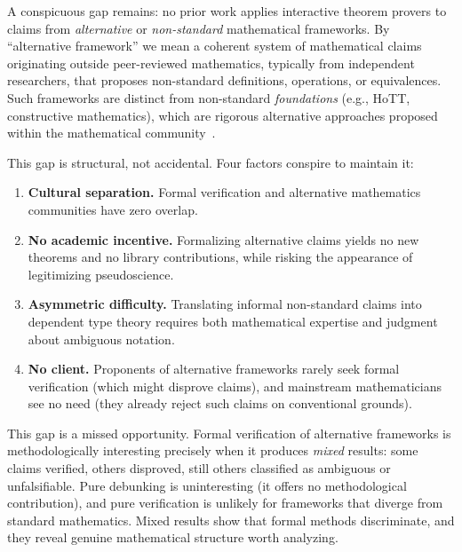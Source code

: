 \documentclass[runningheads]{llncs}
\begin{document}
A conspicuous gap remains: no prior work applies interactive theorem provers to
claims from \emph{alternative} or \emph{non-standard} mathematical frameworks.
By ``alternative framework'' we mean a coherent system of mathematical claims
originating outside peer-reviewed mathematics, typically from independent
researchers, that proposes non-standard definitions, operations, or equivalences.
Such frameworks are distinct from non-standard \emph{foundations} (e.g., HoTT,
constructive mathematics), which are rigorous alternative approaches proposed
within the mathematical community~\cite{shulman2024strange}.

This gap is structural, not accidental. Four factors conspire to maintain it:
\begin{enumerate}
\item \textbf{Cultural separation.} Formal verification and alternative
  mathematics communities have zero overlap.
\item \textbf{No academic incentive.} Formalizing alternative claims yields no
  new theorems and no library contributions, while risking the appearance of
  legitimizing pseudoscience.
\item \textbf{Asymmetric difficulty.} Translating informal non-standard claims
  into dependent type theory requires both mathematical expertise and judgment
  about ambiguous notation.
\item \textbf{No client.} Proponents of alternative frameworks rarely seek
  formal verification (which might disprove claims), and mainstream mathematicians
  see no need (they already reject such claims on conventional grounds).
\end{enumerate}

This gap is a missed opportunity. Formal verification of
alternative frameworks is methodologically interesting precisely when it produces
\emph{mixed} results: some claims verified, others disproved, still others
classified as ambiguous or unfalsifiable. Pure debunking is uninteresting (it
offers no methodological contribution), and pure verification is unlikely for
frameworks that diverge from standard mathematics. Mixed results show that formal
methods discriminate, and they reveal genuine mathematical structure
worth analyzing.
\end{document}
